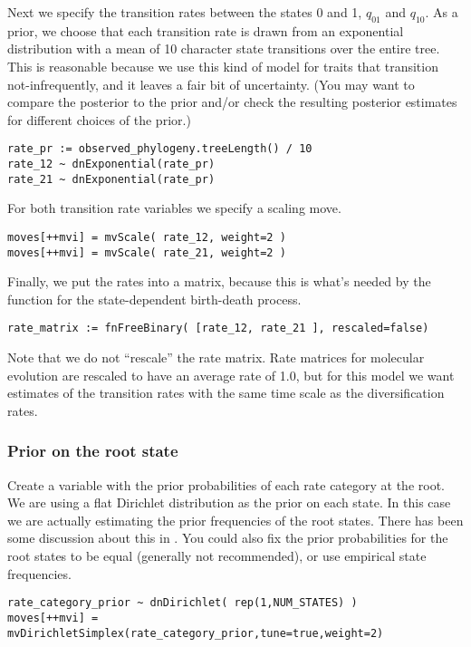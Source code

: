 Next we specify the transition rates between the states 0 and 1, $q_{01}$ and $q_{10}$.
As a prior, we choose that each transition rate is drawn from an exponential distribution with a mean of 10 character state transitions over the entire tree. 
This is reasonable because we use this kind of model for traits that transition not-infrequently, and it leaves a fair bit of uncertainty.
(You may want to compare the posterior to the prior and/or check the resulting posterior estimates for different choices of the prior.)
{\tt \begin{snugshade*}
\begin{lstlisting}
rate_pr := observed_phylogeny.treeLength() / 10
rate_12 ~ dnExponential(rate_pr)
rate_21 ~ dnExponential(rate_pr)
\end{lstlisting}
\end{snugshade*}}
For both transition rate variables we specify a scaling move.
{\tt \begin{snugshade*}
\begin{lstlisting}
moves[++mvi] = mvScale( rate_12, weight=2 )
moves[++mvi] = mvScale( rate_21, weight=2 )
\end{lstlisting}
\end{snugshade*}}
Finally, we put the rates into a matrix, because this is what's needed by the function for the state-dependent birth-death process.
{\tt \begin{snugshade*}
\begin{lstlisting}
rate_matrix := fnFreeBinary( [rate_12, rate_21 ], rescaled=false)
\end{lstlisting}
\end{snugshade*}}
Note that we do not ``rescale'' the rate matrix.
Rate matrices for molecular evolution are rescaled to have an average rate of 1.0, but for this model we want estimates of the transition rates with the same time scale as the diversification rates.

\subsubsection{Prior on the root state}
Create a variable with the prior probabilities of each rate category at the root.
We are using a flat Dirichlet distribution as the prior on each state.
In this case we are actually estimating the prior frequencies of the root states.
There has been some discussion about this in \cite{FitzJohn2009}.
You could also fix the prior probabilities for the root states to be equal (generally not recommended), or use empirical state frequencies. 
{\tt \begin{snugshade*}
\begin{lstlisting}
rate_category_prior ~ dnDirichlet( rep(1,NUM_STATES) )
moves[++mvi] = mvDirichletSimplex(rate_category_prior,tune=true,weight=2)
\end{lstlisting}
\end{snugshade*}}

